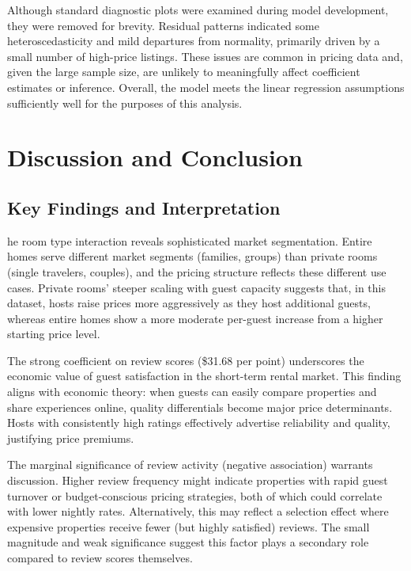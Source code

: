 \documentclass[9pt,a4paper,onecolumn,twoside]{tau-class/tau}
\begin{document}
Although standard diagnostic plots were examined during model development, they were removed for brevity. Residual patterns indicated some heteroscedasticity and mild departures from normality, primarily driven by a small number of high-price listings. These issues are common in pricing data and, given the large sample size, are unlikely to meaningfully affect coefficient estimates or inference. Overall, the model meets the linear regression assumptions sufficiently well for the purposes of this analysis.


\section{Discussion and Conclusion}

\subsection{Key Findings and Interpretation}

he room type interaction reveals sophisticated market segmentation. Entire homes serve different market segments (families, groups) than private rooms (single travelers, couples), and the pricing structure reflects these different use cases. Private rooms’ steeper scaling with guest capacity suggests that, in this dataset, hosts raise prices more aggressively as they host additional guests, whereas entire homes show a more moderate per-guest increase from a higher starting price level.

The strong coefficient on review scores (\$31.68 per point) underscores the economic value of guest satisfaction in the short-term rental market. This finding aligns with economic theory: when guests can easily compare properties and share experiences online, quality differentials become major price determinants. Hosts with consistently high ratings effectively advertise reliability and quality, justifying price premiums.

The marginal significance of review activity (negative association) warrants discussion. Higher review frequency might indicate properties with rapid guest turnover or budget-conscious pricing strategies, both of which could correlate with lower nightly rates. Alternatively, this may reflect a selection effect where expensive properties receive fewer (but highly satisfied) reviews. The small magnitude and weak significance suggest this factor plays a secondary role compared to review scores themselves.
\end{document}
